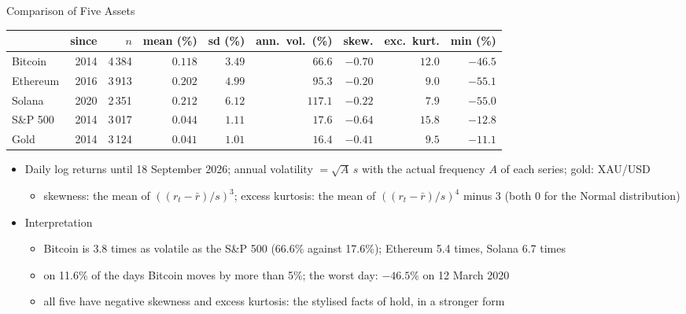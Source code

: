 \begin{frame}{Comparison of Five Assets}
\itemsize{\footnotesize}
\begin{center}
\scriptsize
\begin{tabular}{lrrrrrrrr}
\toprule
& since & $n$ & mean (\%) & sd (\%) & ann.\ vol.\ (\%) & skew. & exc.\ kurt. & min (\%) \\
\midrule
Bitcoin & 2014 & 4\,384 & $0.118$ & $3.49$ & $66.6$ & $-0.70$ & $12.0$ & $-46.5$ \\
Ethereum & 2016 & 3\,913 & $0.202$ & $4.99$ & $95.3$ & $-0.20$ & $9.0$ & $-55.1$ \\
Solana & 2020 & 2\,351 & $0.212$ & $6.12$ & $117.1$ & $-0.22$ & $7.9$ & $-55.0$ \\
S\&P 500 & 2014 & 3\,017 & $0.044$ & $1.11$ & $17.6$ & $-0.64$ & $15.8$ & $-12.8$ \\
Gold & 2014 & 3\,124 & $0.041$ & $1.01$ & $16.4$ & $-0.41$ & $9.5$ & $-11.1$ \\
\bottomrule
\end{tabular}
\end{center}
\begin{itemize}
    \item Daily log returns until 18 September 2026; annual volatility $= \sqrt{A}\,s$ with the actual frequency $A$ of each series; gold: XAU/USD
    \begin{itemize}
        \item skewness: the mean of $((r_t - \bar r)/s)^3$; excess kurtosis: the mean of $((r_t - \bar r)/s)^4$ minus 3 (both 0 for the Normal distribution)
    \end{itemize}
    \item Interpretation
    \begin{itemize}
        \item Bitcoin is 3.8 times as volatile as the S\&P 500 (66.6\% against 17.6\%); Ethereum 5.4 times, Solana 6.7 times
        \item on 11.6\% of the days Bitcoin moves by more than 5\%; the worst day: $-46.5\%$ on 12 March 2020
        \item all five have negative skewness and excess kurtosis: the stylised facts of  hold, in a stronger form
    \end{itemize}
\end{itemize}
\end{frame}

